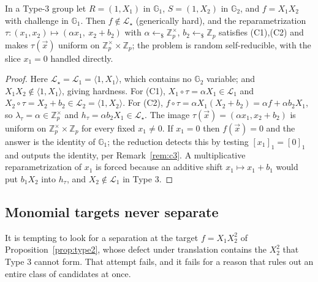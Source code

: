 \documentclass{aicr-solution}
\newcommand{\Gone}{\mathbb{G}_1}
\newcommand{\Gtwo}{\mathbb{G}_2}
\newcommand{\Zp}{\mathbb{Z}_p}
\newcommand{\Zpx}{\mathbb{Z}_p^{\times}}
\newcommand{\vx}{\vec{x}}
\newcommand{\LL}{\mathcal{L}}
\newcommand{\Span}[1]{\langle #1 \rangle} %
\newcommand{\rsample}{\leftarrow_{\$}}
\begin{document}
\begin{proposition}[co-CDH]
\label{prop:cocdh}
In a Type-3 group let $R=(1,X_1)$ in $\Gone$, $S=(1,X_2)$ in $\Gtwo$, and $f=X_1X_2$ with
challenge in $\Gone$. Then $f\notin\LL_\star$ (generically hard), and the reparametrization
$\tau\colon(x_1,x_2)\mapsto(\alpha x_1,\ x_2+b_2)$ with $\alpha\rsample\Zpx$,
$b_2\rsample\Zp$ satisfies \textup{(C1),(C2)} and makes $\tau(\vx)$ uniform on
$\Zpx\times\Zp$; the problem is random self-reducible, with the slice $x_1=0$ handled
directly.
\end{proposition}
\begin{proof}
Here $\LL_\star=\LL_1=\Span{1,X_1}$, which contains no $\Gtwo$ variable; and $X_1X_2\notin
\Span{1,X_1}$, giving hardness. For (C1), $X_1\circ\tau=\alpha X_1\in\LL_1$ and
$X_2\circ\tau=X_2+b_2\in\LL_2=\Span{1,X_2}$. For (C2),
$f\circ\tau=\alpha X_1(X_2+b_2)=\alpha f+\alpha b_2X_1$, so $\lambda_\tau=\alpha\in\Zpx$ and
$h_\tau=\alpha b_2X_1\in\LL_\star$. The image $\tau(\vx)=(\alpha x_1,x_2+b_2)$ is uniform on
$\Zpx\times\Zp$ for every fixed $x_1\neq 0$. If $x_1=0$ then $f(\vx)=0$ and the answer is
the identity of $\Gone$; the reduction detects this by testing $[x_1]_1=[0]_1$ and outputs
the identity, per Remark~\ref{rem:c3}. A multiplicative reparametrization of $x_1$ is forced
because an additive shift $x_1\mapsto x_1+b_1$ would put $b_1X_2$ into $h_\tau$, and
$X_2\notin\LL_1$ in Type 3.
\end{proof}

\subsection{Monomial targets never separate}

It is tempting to look for a separation at the target $f=X_1X_2^{2}$ of
Proposition~\ref{prop:type2}, whose defect under translation contains the $X_2^{2}$ that
Type 3 cannot form. That attempt fails, and it fails for a reason that rules out an entire
class of candidates at once.
\end{document}
